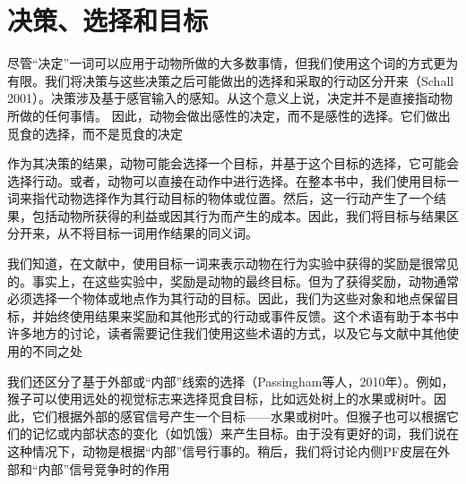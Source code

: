 \section{决策、选择和目标}
尽管“决定”一词可以应用于动物所做的大多数事情，但我们使用这个词的方式更为有限。我们将决策与这些决策之后可能做出的选择和采取的行动区分开来（Schall 2001）。决策涉及基于感官输入的感知。从这个意义上说，决定并不是直接指动物所做的任何事情。
因此，动物会做出感性的决定，而不是感性的选择。它们做出觅食的选择，而不是觅食的决定\par
作为其决策的结果，动物可能会选择一个目标，并基于这个目标的选择，它可能会选择行动。或者，动物可以直接在动作中进行选择。在整本书中，我们使用目标一词来指代动物选择作为其行动目标的物体或位置。然后，这一行动产生了一个结果，包括动物所获得的利益或因其行为而产生的成本。因此，我们将目标与结果区分开来，从不将目标一词用作结果的同义词。\par
我们知道，在文献中，使用目标一词来表示动物在行为实验中获得的奖励是很常见的。事实上，在这些实验中，奖励是动物的最终目标。但为了获得奖励，动物通常必须选择一个物体或地点作为其行动的目标。因此，我们为这些对象和地点保留目标，并始终使用结果来奖励和其他形式的行动或事件反馈。这个术语有助于本书中许多地方的讨论，读者需要记住我们使用这些术语的方式，以及它与文献中其他使用的不同之处\par
我们还区分了基于外部或“内部”线索的选择（Passingham等人，2010年）。例如，猴子可以使用远处的视觉标志来选择觅食目标，比如远处树上的水果或树叶。因此，它们根据外部的感官信号产生一个目标——水果或树叶。但猴子也可以根据它们的记忆或内部状态的变化（如饥饿）来产生目标。由于没有更好的词，我们说在这种情况下，动物是根据“内部”信号行事的。稍后，我们将讨论内侧PF皮层在外部和“内部”信号竞争时的作用\par
